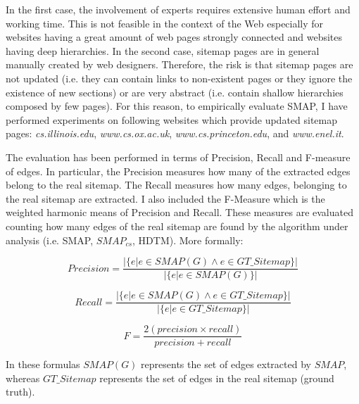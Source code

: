 In the first case, the involvement of experts requires extensive human effort and working time. This is not feasible in the context of the Web especially for websites having a great amount of web pages strongly connected and websites having deep hierarchies. In the second case, sitemap pages are in general manually created by web designers. Therefore, the risk is that sitemap pages are not updated (i.e. they can contain links to non-existent pages or they ignore the existence of new sections) or are very abstract (i.e. contain shallow hierarchies composed by few pages). For this reason, to empirically evaluate SMAP, I have performed experiments on following websites which provide updated sitemap pages: \emph{cs.illinois.edu}, \emph{www.cs.ox.ac.uk}, \emph{www.cs.princeton.edu}, and \emph{www.enel.it}. 

The evaluation has been performed in terms of Precision, Recall and F-measure of edges. In particular, the Precision measures how many of the extracted edges belong to the real sitemap. The Recall measures how many edges, belonging to the real sitemap are extracted.
I also included the F-Measure which is the weighted harmonic means of Precision and Recall. These measures are evaluated counting how many edges of the real sitemap are found by the algorithm under analysis (i.e. SMAP, $SMAP_{cs}$, HDTM).
More formally:


\begin{equation}
Precision= \frac{|\{e| e\in SMAP(G) \wedge e\in GT\_Sitemap \}| }{|\{e| e\in SMAP(G) \}| }
\end{equation} 

\begin{equation}
Recall=\frac{|\{e| e\in SMAP(G) \wedge e\in GT\_Sitemap \}| }{|\{e| e\in GT\_Sitemap \}| }
\end{equation} 


\begin{equation}
F = \frac{2(precision \times recall)}{precision + recall}
\end{equation} 

\noindent In these formulas $SMAP(G)$ represents the set of edges extracted by $SMAP$, whereas $GT\_Sitemap$ represents the set of edges in the real sitemap (ground truth).



